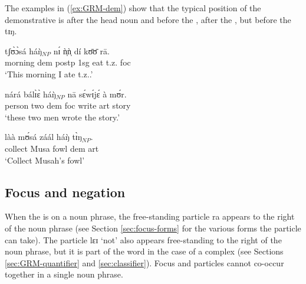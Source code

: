 \begin{exe}
\begin{exe}
\begin{exe}
\begin{exe}
\begin{exe}
\begin{exe}
\begin{exe}
\begin{exe}
\begin{exe}
\begin{exe}
\z



The examples in (\ref{ex:GRM-dem}) show that the typical position of  the
demonstrative is after the head noun and before the , after the
,  but before the  {\sls tɪŋ}. 


\ea\label{ex:GRM-dem} 
 
 
  \ea\label{ex:GRM-dem-n-postp} 
 \gll {\ob}tʃʊ̀ɔ̀sá háŋ̀{\cb}$_{NP}$ nɪ́ ǹ̩ǹ̩ dí kʊ̄ʊ̄ rā.\\
 morning {\sc dem} {\sc postp} {\sc 1sg} eat t.z. {\sc foc}\\
 \glt  `This morning I ate {\sc t.z.}.'

   \ex\label{ex:GRM-dem-num} 
 \gll {\ob}nárá bálɪ̀ɛ̀ háŋ̀{\cb}$_{NP}$ nā sɛ́wɪ́jɛ́ à mʊ́r.\\
person two {\sc dem}  {\sc foc} write {\sc art} story\\
\glt `{\sc these two men} wrote the story.' 

   \ex\label{ex:GRM-dem-art}
 \gll làà {\ob}mʊ́sá záál háŋ̀ tɪ̀ŋ{\cb}$_{NP}$.\\
 collect Musa fowl  {\sc dem} {\sc art}\\
 \glt `Collect  Musah's  fowl'  


 
\z 
 \z




\subsection{Focus and negation}
\label{sec:GRM-foc-neg}

When the  is on a noun phrase, the free-standing particle {\sls ra} appears
to the right of the noun phrase (see Section \ref{sec:focus-forms} for the
various forms the  particle can take). The   particle {\sls lɛɪ} `not' also  appears 
free-standing
to the right of the noun phrase, but it is part of the word in the case of a complex 
(see Sections \ref{sec:GRM-quantifier}  and  \ref{sec:classifier}). Focus and
 particles cannot co-occur together in a single noun phrase.  



\end{exe}
\end{exe}
\end{exe}
\end{exe}
\end{exe}
\end{exe}
\end{exe}
\end{exe}
\end{exe}
\end{exe}
